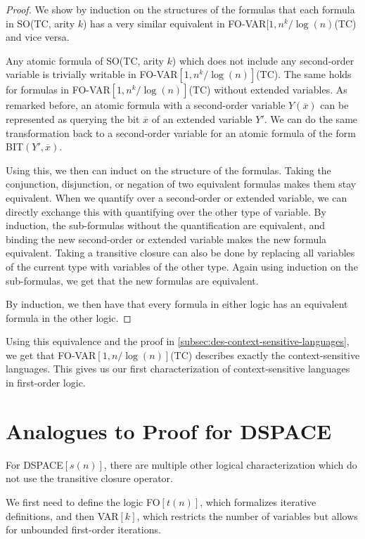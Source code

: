 \begin{proof}
    We show by induction on the structures of the formulas that each formula in SO(TC, arity $k$) has a very similar equivalent in FO-VAR$[1, n^k/\log(n)$(TC) and vice versa.

    Any atomic formula of SO(TC, arity $k$) which does not include any second-order variable is trivially writable in FO-VAR$[1, n^k/\log(n)]$(TC).
    The same holds for formulas in FO-VAR$[1, n^k/\log(n)]$(TC) without extended variables.
    As remarked before, an atomic formula with a second-order variable $Y(\overline{x})$ can be represented as querying the bit $\overline{x}$ of an extended variable $Y'$.
    We can do the same transformation back to a second-order variable for an atomic formula of the form BIT$(Y', \overline{x})$.

    Using this, we then can induct on the structure of the formulas.
    Taking the conjunction, disjunction, or negation of two equivalent formulas makes them stay equivalent.
    When we quantify over a second-order or extended variable, we can directly exchange this with quantifying over the other type of variable.
    By induction, the sub-formulas without the quantification are equivalent, and binding the new second-order or extended variable makes the new formula equivalent.
    Taking a transitive closure can also be done by replacing all variables of the current type with variables of the other type.
    Again using induction on the sub-formulas, we get that the new formulas are equivalent.

    By induction, we then have that every formula in either logic has an equivalent formula in the other logic.
\end{proof}

Using this equivalence and the proof in \cref{subsec:des-context-sensitive-languages}, we get that FO-VAR$[1, n/\log(n)]$(TC) describes exactly the context-sensitive languages.
This gives us our first characterization of context-sensitive languages in first-order logic.


\section{Analogues to Proof for DSPACE}\label{sec:analogues-to-proof-for-dspace}

For DSPACE$[s(n)]$, there are multiple other logical characterization which do not use the transitive closure operator.

We first need to define the logic FO$[t(n)]$, which formalizes iterative definitions, and then VAR$[k]$, which restricts the number of variables but allows for unbounded first-order iterations.

